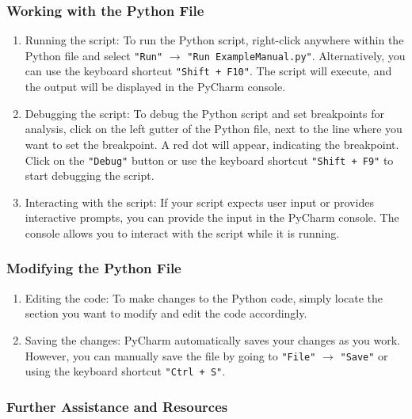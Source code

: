 \subsubsection{Working with the Python File}

\begin{enumerate}
	
	\item Running the script: To run the Python script, right-click anywhere within the Python file and select \texttt{"Run"} $\rightarrow$ \texttt{"Run ExampleManual.py"}. Alternatively, you can use the keyboard shortcut \texttt{"Shift + F10"}. The script will execute, and the output will be displayed in the PyCharm console.
	
	\item Debugging the script: To debug the Python script and set breakpoints for analysis, click on the left gutter of the Python file, next to the line where you want to set the breakpoint. A red dot will appear, indicating the breakpoint. Click on the \texttt{"Debug"} button or use the keyboard shortcut \texttt{"Shift + F9"} to start debugging the script.
	
	\item Interacting with the script: If your script expects user input or provides interactive prompts, you can provide the input in the PyCharm console. The console allows you to interact with the script while it is running.
	
\end{enumerate}

\subsubsection{Modifying the Python File}

\begin{enumerate}
	
	\item Editing the code: To make changes to the Python code, simply locate the section you want to modify and edit the code accordingly.
	
	\item Saving the changes: PyCharm automatically saves your changes as you work. However, you can manually save the file by going to \texttt{"File"} $\rightarrow$ \texttt{"Save"} or using the keyboard shortcut \texttt{"Ctrl + S"}.
	
\end{enumerate}

\subsubsection{Further Assistance and Resources}

